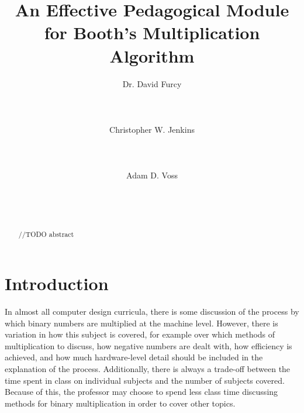 \documentclass{acm_proc_article-sp}
\begin{document}
\title{An Effective Pedagogical Module for Booth's Multiplication Algorithm}

\author{
    \alignauthor
    Dr. David
Furcy\\
       \\
       \\
       \\
    \alignauthor
    Christopher W.
Jenkins\\
       \\
       \\
       \\
    \alignauthor
    Adam D.
Voss\\
       \\
       \\
       \\
}

\maketitle

\begin{abstract}
//TODO abstract
\end{abstract}

\section{Introduction}
In almost all computer design curricula, there is some discussion of the process by which binary numbers are multiplied at the machine level.
However, there is variation in how this subject is covered, for example over which methods of multiplication to discuss, how negative numbers are dealt with, how efficiency is achieved, and how much hardware-level detail should be included in the explanation of the process.
Additionally, there is always a trade-off between the time spent in class on individual subjects and the number of subjects covered.
Because of this, the professor may choose to spend less class time discussing methods for binary multiplication in order to cover other topics.
\end{document}
